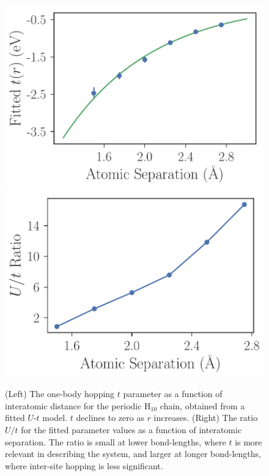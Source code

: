 \begin{figure}
\centering
\includegraphics[scale=0.5]{./Figures/fitted_t_values_no_offset_h10_chain.pdf}
\includegraphics[scale=0.5]{./Figures/Ust_ratio_vs_separation_h_chain.pdf}
\caption{(Left) The one-body hopping $t$ parameter as a function of interatomic distance for the periodic H$_{10}$ chain, obtained from a fitted $U$-$t$ model. $t$ declines to zero as $r$ increases. (Right) The ratio $U/t$ for the fitted parameter values as a function of interatomic separation. The ratio is small at lower bond-lengths, where $t$ is more relevant in describing the system, and larger at longer bond-lengths, where inter-site hopping is less significant. }\label{fig:Parameters-vs-Bond-t}
\end{figure}
